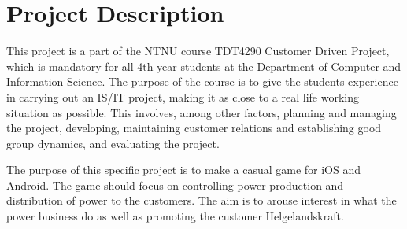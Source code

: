 \section{Project Description}

This project is a part of the NTNU course TDT4290 Customer Driven Project, which is mandatory for all 4th year students at the Department of Computer and Information Science. The purpose of the course is to give the students experience in carrying out an IS/IT project, making it as close to a real life working situation as possible. This involves, among other factors, planning and managing the project, developing, maintaining customer relations and establishing good group dynamics, and evaluating the project.


The purpose of this specific project is to make a casual game for iOS and Android. The game should focus on controlling power production and distribution of power to the customers. The aim is to arouse interest in what the power business do as well as promoting the customer Helgelandskraft.
